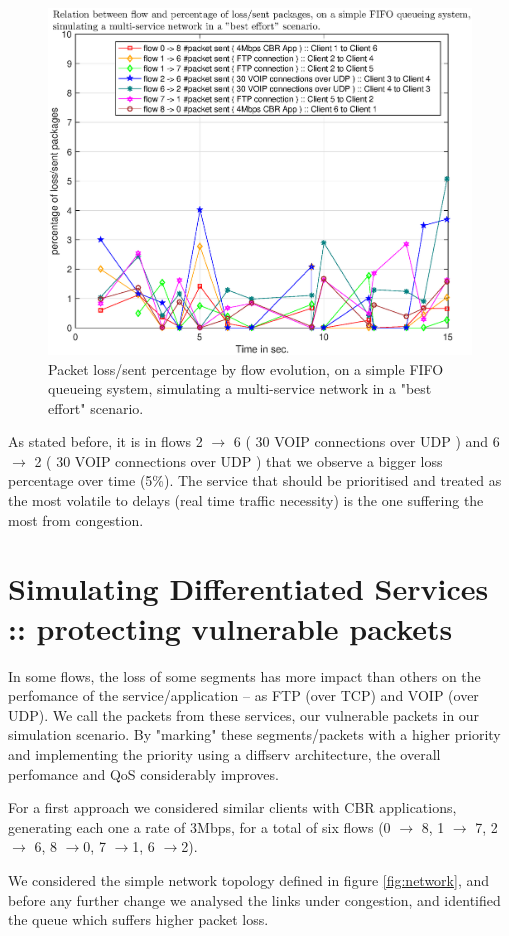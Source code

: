\documentclass[conference,compsoc]{IEEEtran}
\begin{document}
     \begin{figure}[H]
     \centering
     \includegraphics[width=1\columnwidth]{EPS/B/loss_sent_percentage_b1.eps}
     \caption{Packet loss/sent percentage by flow evolution, on a simple FIFO queueing system, simulating a multi-service network in a "best effort" scenario.}
     \label{graph:loss_sent_percentage_b1}
     \end{figure}


     As stated before, it is in flows 2 $ \rightarrow $ 6 ( 30 VOIP connections over UDP ) and 6 $ \rightarrow $ 2 ( 30 VOIP connections over UDP ) that we observe a bigger loss percentage over time (5\%). The service that should be prioritised and treated as the most volatile to delays (real time traffic necessity) is the one suffering the most from congestion. 

\section{Simulating Differentiated Services :: protecting vulnerable packets}
\label{diffserv}
In some flows, the loss of some segments has more impact than others on the perfomance of the service/application -- as FTP (over TCP) and VOIP (over UDP). We call the packets from these services, our vulnerable packets in our simulation scenario. By "marking" these segments/packets with a higher priority and implementing the priority using a diffserv architecture, the overall perfomance and QoS considerably improves. \par 
For a first approach we considered similar clients with CBR applications,  generating each one a rate of 3Mbps, for a total of six flows (0 $ \rightarrow $ 8, 1 $ \rightarrow $ 7, 2 $ \rightarrow $ 6, 8 $ \rightarrow $0, 7 $ \rightarrow $1,    6 $ \rightarrow $2).\par 
We considered the simple network topology defined in figure \ref{fig:network}, and before any further change we analysed the links under congestion, and identified the queue which suffers higher packet
loss.\par 
\end{document}
